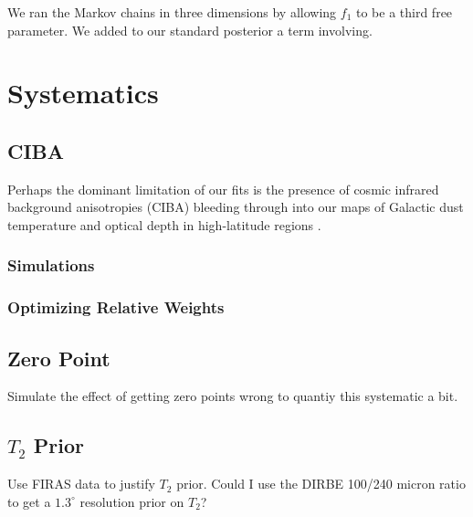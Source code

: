 \documentclass{emulateapj}
\begin{document}
We ran the Markov chains in three dimensions by allowing 
$f_1$ to be a third free parameter. We added to our standard posterior a 
term involving.

\section{Systematics}

\subsection{CIBA}
Perhaps the dominant limitation of our fits is the presence of cosmic
infrared background anisotropies (CIBA) bleeding through into our maps of 
Galactic dust temperature and optical depth in high-latitude regions 
\citep{ciba}.
\subsubsection{Simulations}

\subsubsection{Optimizing Relative Weights}



\subsection{Zero Point}
Simulate the effect of getting zero points wrong to quantiy this
systematic a bit.

\subsection{$T_{2}$ Prior}
Use FIRAS data to justify $T_2$ prior. Could I use the DIRBE 100/240 micron
ratio to get a $1.3^{\circ}$ resolution prior on $T_2$?
\end{document}
